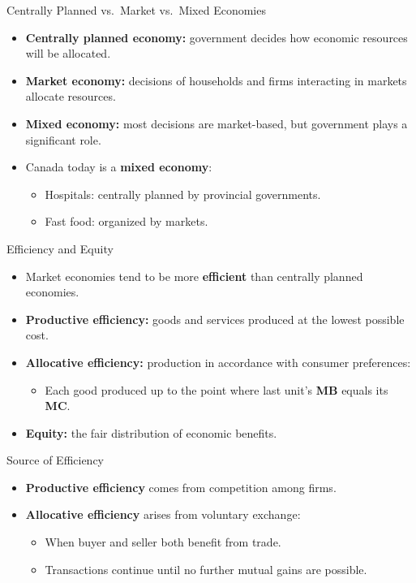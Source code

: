 \documentclass[aspectratio=169]{beamer}
\begin{document}
\begin{frame}{Centrally Planned vs.\ Market vs.\ Mixed Economies}
\transfade
\begin{itemize}[<+->]
  \item \textbf{Centrally planned economy:} government decides how economic resources will be allocated.
  \item \textbf{Market economy:} decisions of households and firms interacting in markets allocate resources.
  \item \textbf{Mixed economy:} most decisions are market-based, but government plays a significant role.
  \item Canada today is a \textbf{mixed economy}:
  \begin{itemize}[<+->]
    \item Hospitals: centrally planned by provincial governments.
    \item Fast food: organized by markets.
  \end{itemize}
\end{itemize}
\end{frame}

\begin{frame}{Efficiency and Equity}
\transfade
\begin{itemize}[<+->]
  \item Market economies tend to be more \textbf{efficient} than centrally planned economies.
  \item \textbf{Productive efficiency:} goods and services produced at the lowest possible cost.
  \item \textbf{Allocative efficiency:} production in accordance with consumer preferences:
  \begin{itemize}[<+->]
    \item Each good produced up to the point where last unit's \textbf{MB} equals its \textbf{MC}.
  \end{itemize}
  \item \textbf{Equity:} the fair distribution of economic benefits.
\end{itemize}
\end{frame}

\begin{frame}{Source of Efficiency}
\transfade
\begin{itemize}[<+->]
  \item \textbf{Productive efficiency} comes from \alert{competition} among firms.
  \item \textbf{Allocative efficiency} arises from \alert{voluntary exchange}:
  \begin{itemize}[<+->]
    \item When buyer and seller both benefit from trade.
    \item Transactions continue until no further mutual gains are possible.
  \end{itemize}
\end{itemize}
\end{frame}
\end{document}
